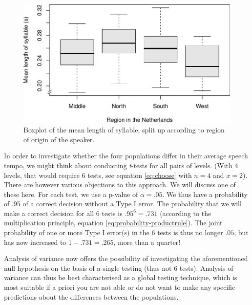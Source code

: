 \documentclass[
]{book}
\begin{document}
\begin{figure}
\centering
\includegraphics{QMS-EN_files/figure-latex/sylduration-boxplot-1.pdf}
\caption{\label{fig:sylduration-boxplot}Boxplot of the mean length of syllable, split up according to region of origin of the speaker.}
\end{figure}

In order to investigate whether the four populations differ in their average
speech tempo, we might think about conducting \emph{t}-tests for all pairs
of levels. (With 4 levels, that would require 6 tests, see
equation \eqref{eq:choose} with \(n=4\) and \(x=2\)). There are however various
objections to this approach. We will discuss one of these here. For
each test, we use a p-value of \(\alpha=.05\).
We thus have a probability of .95 of a correct decision without a Type I error.
The probability that we will make a correct decision for all 6 tests is
\(.95^6 = .731\) (according to the multiplication principle,
equation \eqref{eq:probability-productrule}).
The joint probability of one or more
Type I error(s) in the 6 tests is thus no longer \(.05\), but has now
increased to \(1-.731 = .265\), more than a quarter!

Analysis of variance now offers the possibility of investigating the
aforementioned null hypothesis on the basis of
a single testing (thus not 6 tests). Analysis of variance can thus be best
characterised as a global testing technique, which is most suitable
if a priori you are not able or do not want to make any specific predictions
about the differences between the populations.
\end{document}
